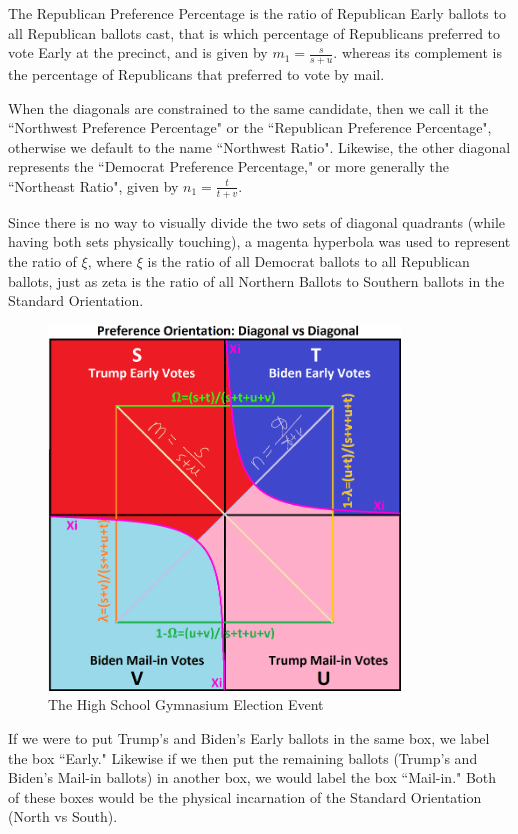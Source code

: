 \documentclass[preprint,13pt]{elsarticle}
\begin{document}
The Republican Preference Percentage is the ratio of Republican Early ballots to all Republican ballots cast, that is which percentage of Republicans preferred to vote Early at the precinct, and is given by $m_{1}=\frac{s}{s+u}$. whereas its complement is the percentage of Republicans that preferred to vote by mail.

When the diagonals are constrained to the same candidate, then we call it the ``Northwest Preference Percentage" or the ``Republican Preference Percentage", otherwise we default to the name ``Northwest Ratio". Likewise, the other diagonal represents the ``Democrat Preference Percentage," or more generally the ``Northeast Ratio", given by $n_{1}=\frac{t}{t+v}$.

Since there is no way to visually divide the two sets of diagonal quadrants (while having both sets physically touching), a magenta hyperbola was used to represent the ratio of $\xi$, where $\xi$ is the ratio of all Democrat ballots to all Republican ballots, just as zeta is the ratio of all Northern Ballots to Southern ballots in the Standard Orientation.
\begin{figure}[bp!]
\begin{center}
\caption{The High School Gymnasium Election Event}
\includegraphics[width=265pt]{Diagonal vs Diagonal.png}
\end{center}
\end{figure}
\newpage
If we were to put Trump's and Biden's Early ballots in the same box, we label the box ``Early." Likewise if we then put the remaining ballots (Trump's and Biden's Mail-in ballots) in another box, we would label the box ``Mail-in." Both of these boxes would be the physical incarnation of the Standard Orientation (North vs South).
\end{document}
